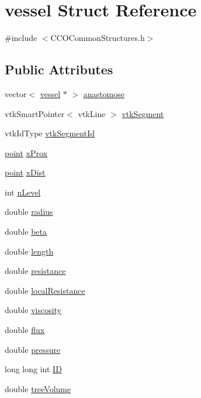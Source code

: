 \hypertarget{structvessel}{}\section{vessel Struct Reference}
\label{structvessel}


{\ttfamily \#include $<$C\+C\+O\+Common\+Structures.\+h$>$}

\subsection*{Public Attributes}
\begin{DoxyCompactItemize}
\item 
vector$<$ \hyperlink{structvessel}{vessel} $\ast$ $>$ \hyperlink{structvessel_a621be11a4aabcc07863d07943060489e}{anastomose}
\item 
vtk\+Smart\+Pointer$<$ vtk\+Line $>$ \hyperlink{structvessel_a94ada1fa10871eef938547df1267d66e}{vtk\+Segment}
\item 
vtk\+Id\+Type \hyperlink{structvessel_a5a44bb20222578bb67bf051164db7aad}{vtk\+Segment\+Id}
\item 
\hyperlink{structpoint}{point} \hyperlink{structvessel_adc62693cc81142b471ec2aa525ba3bf5}{x\+Prox}
\item 
\hyperlink{structpoint}{point} \hyperlink{structvessel_a0e84e9c1ccb9da3aea7145d63e803a30}{x\+Dist}
\item 
int \hyperlink{structvessel_a40fb8bafbcd5654dc9bb48d49c97623a}{n\+Level}
\item 
double \hyperlink{structvessel_a9bbe9528519d0df7931d2d3665ba45a6}{radius}
\item 
double \hyperlink{structvessel_a46380f25d12bee7300dfa5ad38ba9b38}{beta}
\item 
double \hyperlink{structvessel_a1336113e8af54e746e2b57ea4b4055d2}{length}
\item 
double \hyperlink{structvessel_a86ef98b7df955a65573227a3cde46caf}{resistance}
\item 
double \hyperlink{structvessel_aecef2a9ca74e4f42446c97b1e2d5ba9f}{local\+Resistance}
\item 
double \hyperlink{structvessel_af3e4426db331f595682f9f1b3e4226c4}{viscosity}
\item 
double \hyperlink{structvessel_a48f09ecdb7e15a0194a76a83c540c55a}{flux}
\item 
double \hyperlink{structvessel_aa4e3a943682104860826bc33f582b2a1}{pressure}
\item 
long long int \hyperlink{structvessel_acf4d4ad91fbe09a5a5875b23b940c9ac}{ID}
\item 
double \hyperlink{structvessel_af3b90f07ee76daa83102037ce22a1b9e}{tree\+Volume}
\end{DoxyCompactItemize}


